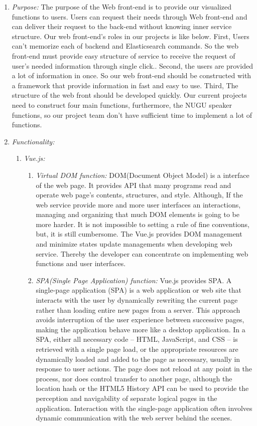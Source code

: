 \documentclass[conference]{IEEEtran}
\begin{document}
\begin{enumerate}
  \item \textit{Purpose: } The purpose of the Web front-end is to provide our visualized functions to users. Users can request their needs through Web front-end and can deliver their request to the back-end without knowing inner service structure. Our web front-end’s roles in our projects is like below.
First, Users can’t memorize each of backend and Elasticsearch commands. So the web front-end must provide easy structure of service to receive the request of user’s needed information through single click..
Second, the users are provided a lot of information in once. So our web front-end should be constructed with a framework that provide information in fast and easy to use.
Third, The structure of the web front should be developed quickly. Our current projects need to construct four main functions, furthermore, the NUGU speaker functions, so our project team don’t have sufficient time to implement a lot of functions. \\
  \item \textit{Functionality: }
 \begin{enumerate}
\item \textit {Vue.js: }  
\begin{enumerate}
\item \textit {Virtual DOM function:} DOM(Document Object Model) is a interface of the web page. It provides API that many programs read and operate web page’s contents, structures, and style. Although, If the web service provide more and more user interfaces an interactions, managing and organizing that much DOM elements is going to be more harder. It is not impossible to setting a rule of fine conventions, but, it is still cumbersome. The Vue.js provides DOM management and minimize states update managements when developing web service. Thereby the developer can concentrate on implementing web functions and user interfaces.
\item \textit {SPA(Single Page Application) function:} Vue.js provides SPA. A single-page application (SPA) is a web application or web site that interacts with the user by dynamically rewriting the current page rather than loading entire new pages from a server. This approach avoids interruption of the user experience between successive pages, making the application behave more like a desktop application. In a SPA, either all necessary code – HTML, JavaScript, and CSS – is retrieved with a single page load, or the appropriate resources are dynamically loaded and added to the page as necessary, usually in response to user actions. The page does not reload at any point in the process, nor does control transfer to another page, although the location hash or the HTML5 History API can be used to provide the perception and navigability of separate logical pages in the application. Interaction with the single-page application often involves dynamic communication with the web server behind the scenes.

\end{enumerate}
\end{enumerate}
\end{enumerate}
\end{document}
